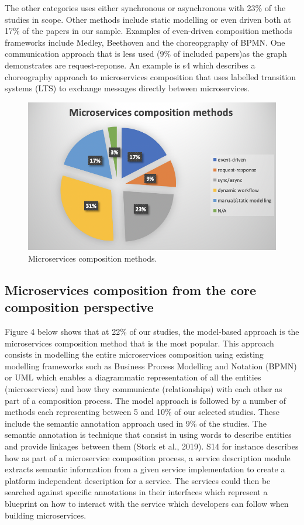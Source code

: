 \documentclass{article}
\begin{document}
\begin{multicols}{2}
The other categories uses either synchronous or asynchronous with 23\% of the studies in scope. Other methods include static modelling or even driven both at 17\%  of the papers in our sample. Examples of even-driven composition methods frameworks include Medley, Beethoven and the choreopgraphy of BPMN. One communication approach that is less used (9\% of included papers)as the graph demonstrates are request-reponse. An example is s4 which describes a choreography approach to microservices composition that uses labelled transition systems (LTS) to exchange messages directly between microservices.

\begin{figure}[htbp]
 \centerline{\includegraphics[scale=0.60]{mce-comp-by-method.png}}
  \caption{Microservices composition methods.}
  \label{fig}
\end{figure}

\subsection{Microservices composition from the core composition perspective}


Figure 4 below shows that at 22\% of our studies, the model-based approach is the microservices composition method that is the most popular. This approach consists in modelling the entire microservices composition using existing modelling frameworks such as Business Process Modelling and Notation (BPMN) or UML which enables a diagrammatic representation of all the entities (microservices) and how they communicate (relationships) with each other as part of a composition process. The model approach is followed by a number of methods each representing between 5 and 10\% of our selected studies. These include the semantic annotation approach used in 9\% of the studies. The semantic annotation is technique that consist in using words to describe entities and provide linkages between them (Stork et al., 2019). S14 for instance describes how as part of a microservice composition process, a service description module extracts semantic information from a given service implementation to create a platform independent description for a service. The services could then be searched against specific annotations in their interfaces which represent a blueprint on how to interact with the service which developers can follow when building microservices. 


\end{multicols}
\end{document}
